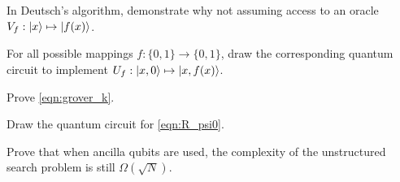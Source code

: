 \begin{exer}
In Deutsch's algorithm, demonstrate why not assuming access to an oracle $V_f:\ket{x}\mapsto\ket{f(x)}$.
\end{exer}

\begin{exer}
For all possible mappings $f:\{0,1\}\to\{0,1\}$, draw the corresponding quantum circuit to implement $U_f:\ket{x,0}\mapsto\ket{x,f(x)}$.
\end{exer}

\begin{exer}
Prove \cref{eqn:grover_k}.
\end{exer}

\begin{exer}
Draw the quantum circuit for \cref{eqn:R_psi0}.
\end{exer}

\begin{exer}
Prove that when ancilla qubits are used, the complexity of the unstructured search problem is still $\Omega(\sqrt{N})$.
\end{exer}
